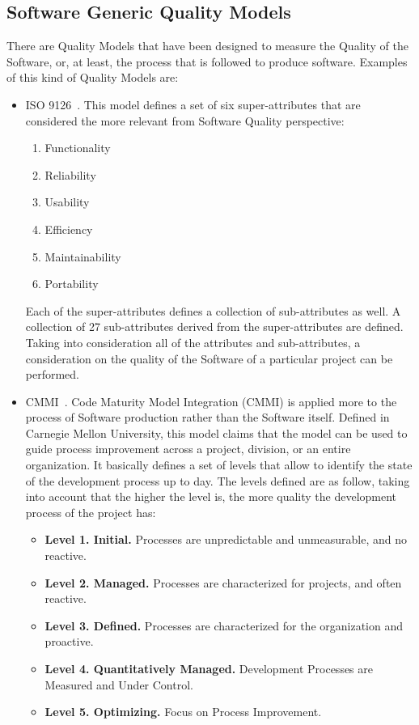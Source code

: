 \documentclass[11pt]{article}
\begin{document}
\subsection{Software Generic Quality Models}
There are Quality Models that have been designed to measure the Quality of the Software, or, at least, the process that is followed to produce software. Examples of this kind of Quality Models are:
\begin{itemize}\itemsep0pt
\item{ISO 9126}~\cite{ISO00, ISO01}.
This model defines a set of six super-attributes that are considered the more relevant from Software Quality perspective:
\begin{enumerate}
\item{Functionality}
\item{Reliability}
\item{Usability}
\item{Efficiency}
\item{Maintainability}
\item{Portability}
\end{enumerate}
Each of the super-attributes defines a collection of sub-attributes as well. A collection of 27 sub-attributes derived from the super-attributes are defined.
Taking into consideration all of the attributes and sub-attributes, a consideration on the quality of the Software of a particular project can be performed.
\item{CMMI}~\cite{CMMI00}.
Code Maturity Model Integration (CMMI) is applied more to the process of Software production rather than the Software itself. Defined in Carnegie Mellon University, this model claims that the model can be used to guide process improvement across a project, division, or an entire organization.
It basically defines a set of levels that allow to identify the state of the development process up to day. The levels defined are as follow, taking into account that the higher the level is, the more quality the development process of the project has:

\begin{itemize}\itemsep0pt
\item{\textbf{Level 1. Initial.}} Processes are unpredictable and unmeasurable, and no reactive.
\item{\textbf{Level 2. Managed.}} Processes are characterized for projects, and often reactive.
\item{\textbf{Level 3. Defined.}} Processes are characterized for the organization and proactive. 
\item{\textbf{Level 4. Quantitatively Managed.}} Development Processes are Measured and Under Control.
\item{\textbf{Level 5. Optimizing.}} Focus on Process Improvement.
\end{itemize}
\end{itemize}
\end{document}
